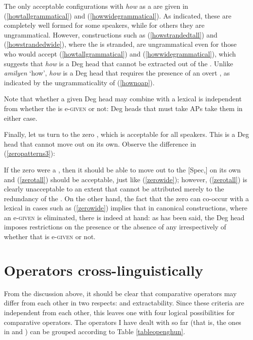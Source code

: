 The only acceptable configurations with \textit{how} as a  are given in (\ref{howtallgrammatical}) and (\ref{howwidegrammatical}). As indicated, these are completely well formed for some speakers, while for others they are ungrammatical. However, constructions such as (\ref{howstrandedtall}) and (\ref{howstrandedwide}), where the  is stranded, are ungrammatical even for those who would accept (\ref{howtallgrammatical}) and (\ref{howwidegrammatical}), which suggests that \textit{how} is a Deg head that cannot be extracted out of the . Unlike  \textit{amilyen} `how', \textit{how} is a Deg head that requires the presence of an overt , as indicated by the ungrammaticality of (\ref{hownoap}).

Note that whether a given Deg head may combine with a lexical  is independent from whether the  is e-\textsc{given} or not: Deg heads that must take APs take them in either case.

Finally, let us turn to the zero , which is acceptable for all  speakers. This is a Deg head that cannot move out on its own. Observe the difference in (\ref{zeropatterns3}):

\ea \label{zeropatterns3}
 \label{zerotall}
 \label{zerowide}
\z
\z

If the zero were a  , then it should be able to move out to the [Spec,] on its own and (\ref{zerotall}) should be acceptable, just like (\ref{zerowide}); however, (\ref{zerotall}) is clearly unacceptable to an extent that cannot be attributed merely to the redundancy of the . On the other hand, the fact that the zero can co-occur with a lexical  in cases such as (\ref{zerowide}) implies that in canonical  constructions, where an e-\textsc{given}  is eliminated, there is indeed  at hand: as has been said, the Deg head imposes restrictions on the presence or the absence of any  irrespectively of whether that  is e-\textsc{given} or not.

\section{Operators cross-linguistically} \label{sec:3operatorscrosslinguistically}
From the discussion above, it should be clear that comparative operators may differ from each other in two respects:  and extractability. Since these criteria are independent from each other, this leaves one with four logical possibilities for comparative operators. The operators I have dealt with so far (that is, the ones in  and ) can be grouped according to Table \ref{tableopenghun}.

